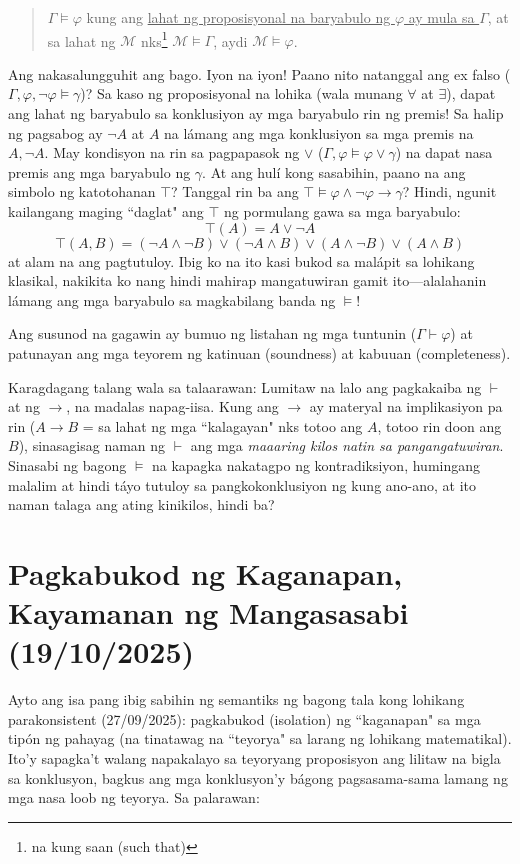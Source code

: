 \documentclass{article}
\begin{document}
\begin{quote}
$\Gamma\models\varphi$ kung ang \underline{lahat ng proposisyonal na baryabulo ng $\varphi$ ay mula sa $\Gamma$}, at sa lahat ng $\mathcal{M}$ nks\footnote{na kung saan (such that)} $\mathcal{M}\models\Gamma$, aydi $\mathcal{M}\models\varphi$.
\end{quote}

Ang nakasalungguhit ang bago. Iyon na iyon! Paano nito natanggal ang ex falso ($\Gamma, \varphi, \neg\varphi\models\gamma$)? Sa kaso ng proposisyonal na lohika (wala munang $\forall$ at $\exists$), dapat ang lahat ng baryabulo sa konklusiyon ay mga baryabulo rin ng premis! Sa halip ng pagsabog ay $\neg A$ at $A$ na lámang ang mga konklusiyon sa mga premis na $A, \neg A$. May kondisyon na rin sa pagpapasok ng $\vee$ ($\Gamma, \varphi\models\varphi\vee\gamma$) na dapat nasa premis ang mga baryabulo ng $\gamma$. At ang hulí kong sasabihin, paano na ang simbolo ng katotohanan $\top$? Tanggal rin ba ang $\top\models\varphi\wedge\neg\varphi\rightarrow\gamma$? Hindi, ngunit kailangang maging ``daglat" ang $\top$ ng pormulang gawa sa mga baryabulo: $$\top(A) = A \vee \neg A$$ $$\top(A,B) = (\neg A \wedge \neg B) \vee (\neg A \wedge B) \vee (A \wedge \neg B) \vee ( A \wedge B)$$at alam na ang pagtutuloy. Ibig ko na ito kasi bukod sa malápit sa lohikang klasikal, nakikita ko nang hindi mahirap mangatuwiran gamit ito---alalahanin lámang ang mga baryabulo sa magkabilang banda ng $\models$!

Ang susunod na gagawin ay bumuo ng listahan ng mga tuntunin ($\Gamma\vdash\varphi$) at patunayan ang mga teyorem ng katinuan (soundness) at kabuuan (completeness).

Karagdagang talang wala sa talaarawan: Lumitaw na lalo ang pagkakaiba ng $\vdash$ at ng $\rightarrow$, na madalas napag-iisa. Kung ang $\rightarrow$ ay materyal na implikasiyon pa rin ($A\rightarrow B$ = sa lahat ng mga ``kalagayan" nks totoo ang $A$, totoo rin doon ang $B$), sinasagisag naman ng $\vdash$ ang mga \textit{maaaring kilos natin sa pangangatuwiran}. Sinasabi ng bagong $\models$ na kapagka nakatagpo ng kontradiksiyon, humingang malalim at hindi táyo tutuloy sa pangkokonklusiyon ng kung ano-ano, at ito naman talaga ang ating kinikilos, hindi ba?

\section{Pagkabukod ng Kaganapan, Kayamanan ng Mangasasabi (19/10/2025)}
Ayto ang isa pang ibig sabihin ng semantiks ng bagong tala kong lohikang parakonsistent (27/09/2025): pagkabukod (isolation) ng ``kaganapan" sa mga tipón ng pahayag (na tinatawag na ``teyorya" sa larang ng lohikang matematikal). Ito'y sapagka't walang napakalayo sa teyoryang proposisyon ang lilitaw na bigla sa konklusyon, bagkus ang mga konklusyon'y bágong pagsasama-sama lamang ng mga nasa loob ng teyorya. Sa palarawan:
\end{document}
